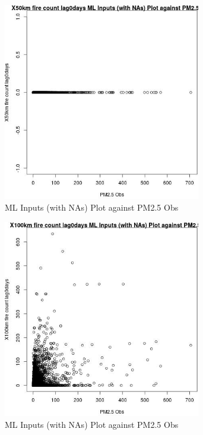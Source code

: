 \begin{figure} 
\centering  
\includegraphics[width=0.77\textwidth]{Code_Outputs/Report_ML_input_PM25_Step4_part_e_de_duplicated_aves_compiled_2019-05-14wNAs_X50km_fire_count_lag0daysvPM25_Obs.jpg} 
\caption{\label{fig:Report_ML_input_PM25_Step4_part_e_de_duplicated_aves_compiled_2019-05-14wNAsX50km_fire_count_lag0daysvPM25_Obs}ML Inputs (with NAs) Plot against PM2.5 Obs} 
\end{figure} 
 

\begin{figure} 
\centering  
\includegraphics[width=0.77\textwidth]{Code_Outputs/Report_ML_input_PM25_Step4_part_e_de_duplicated_aves_compiled_2019-05-14wNAs_X100km_fire_count_lag0daysvPM25_Obs.jpg} 
\caption{\label{fig:Report_ML_input_PM25_Step4_part_e_de_duplicated_aves_compiled_2019-05-14wNAsX100km_fire_count_lag0daysvPM25_Obs}ML Inputs (with NAs) Plot against PM2.5 Obs} 
\end{figure} 
 

